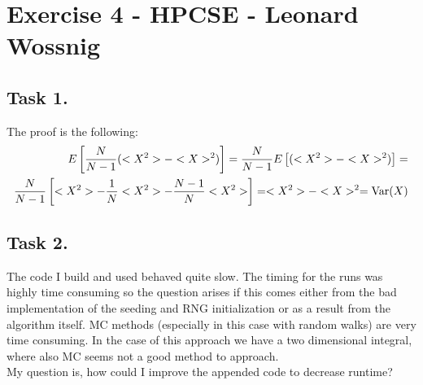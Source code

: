 \documentclass[12pt]{scrbook}
\begin{document}
\section{Exercise 4 - HPCSE - Leonard Wossnig}
\subsection{Task 1.}
The proof is the following:
\begin{align}
E \left[ \frac{N}{N-1} (<X^2> - <X>^2) \right] =  \frac{N}{N-1} E \left[(<X^2> - <X>^2) \right] = \notag \\
\frac{N}{N-1} \left[<X^2> - \frac{1}{N} <X^2> - \frac{N-1}{N} <X^2>\right] = <X^2> - <X>^2 = \text{Var} (X)
\end{align}

\subsection{Task 2.}
The code I build and used behaved quite slow. The timing for the runs was highly time consuming so the question arises if this comes either from the bad implementation of the seeding and RNG initialization or as a result from the algorithm itself. MC methods (especially in this case with random walks) are very time consuming. In the case of this approach we have a two dimensional integral, where also MC seems not a good method to approach. \\
My question is, how could I improve the appended code to decrease runtime?\\
\end{document}
